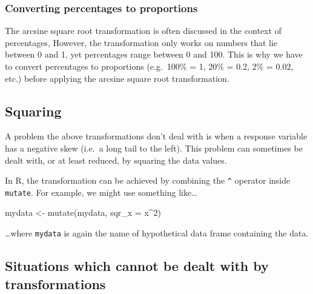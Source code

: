 \documentclass[
]{book}
\newenvironment{Shaded}{\begin{snugshade}}{\end{snugshade}}
\newcommand{\AttributeTok}[1]{\textcolor[rgb]{0.77,0.63,0.00}{#1}}
\newcommand{\DecValTok}[1]{\textcolor[rgb]{0.00,0.00,0.81}{#1}}
\newcommand{\FunctionTok}[1]{\textcolor[rgb]{0.00,0.00,0.00}{#1}}
\newcommand{\NormalTok}[1]{#1}
\newcommand{\OtherTok}[1]{\textcolor[rgb]{0.56,0.35,0.01}{#1}}
\newcommand{\SpecialCharTok}[1]{\textcolor[rgb]{0.00,0.00,0.00}{#1}}
\newenvironment{greybox}{
  \definecolor{shadecolor}{rgb}{0.95,0.95,0.95}  %
  \color{black}
  \begin{shaded}}
 {\end{shaded}}
\newenvironment{infobox}[1]
  {
  \begin{itemize}
  \renewcommand{\labelitemi}{
    \raisebox{-.7\height}[0pt][0pt]{
      {\setkeys{Gin}{width=3em,keepaspectratio}
        \texttt{[image: images/\#1]}}
    }
  }
  \setlength{\fboxsep}{1em}
  \begin{greybox}
  \item
  }
  {
  \end{greybox}
  \end{itemize}
  }
\begin{document}
\begin{infobox}{warning}

\hypertarget{converting-percentages-to-proportions}{%
\subsubsection*{Converting percentages to proportions}\label{converting-percentages-to-proportions}}

The arcsine square root transformation is often discussed in the context of percentages, However, the transformation only works on numbers that lie between 0 and 1, yet percentages range between 0 and 100. This is why we have to convert percentages to proportions (e.g.~100\% = 1, 20\% = 0.2, 2\% = 0.02, etc.) before applying the arcsine square root transformation.

\end{infobox}

\hypertarget{squaring}{%
\subsection{Squaring}\label{squaring}}

A problem the above transformations don't deal with is when a response variable has a negative skew (i.e.~a long tail to the left). This problem can sometimes be dealt with, or at least reduced, by squaring the data values.

In R, the transformation can be achieved by combining the \texttt{\^{}} operator inside \texttt{mutate}. For example, we might use something like\ldots{}

\begin{Shaded}
\begin{Highlighting}[]
\NormalTok{mydata }\OtherTok{\textless{}{-}} \FunctionTok{mutate}\NormalTok{(mydata, }\AttributeTok{sqr\_x =}\NormalTok{ x}\SpecialCharTok{\^{}}\DecValTok{2}\NormalTok{)}
\end{Highlighting}
\end{Shaded}

\ldots where \texttt{mydata} is again the name of hypothetical data frame containing the data.

\hypertarget{situations-which-cannot-be-dealt-with-by-transformations}{%
\subsection{Situations which cannot be dealt with by transformations}\label{situations-which-cannot-be-dealt-with-by-transformations}}
\end{document}
